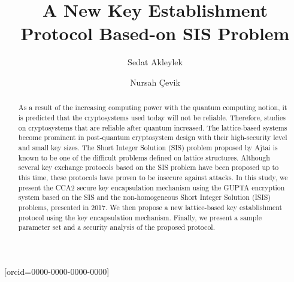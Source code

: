 \documentclass[a4paper,fleqn]{cas-dc}
\begin{document}
\let\WriteBookmarks\relax
\def\floatpagepagefraction{1}
\def\textpagefraction{.001}

\title [mode = title]{A New Key Establishment Protocol Based-on SIS Problem}          
\tnotemark[1,2]



\author[1]{Sedat Akleylek}[orcid=0000-0000-0000-0000]     
\cormark[1]

\author[1]{Nursah \c{C}evik}
\fnmark[1]

\address[1]{Department of Computer Engineering, Faculty of Engineering, Ondokuz Mayis University, Samsun, Turkey}








\begin{abstract}
	As a result of the increasing computing power with the quantum computing notion, it is predicted that the cryptosystems used today will not be reliable. Therefore, studies on cryptosystems that are reliable after quantum increased. The lattice-based systems become prominent in post-quantum cryptosystem design with their high-security level and small key sizes. The Short Integer Solution (SIS) problem proposed by Ajtai is known to be one of the difficult problems defined on lattice structures. Although several key exchange protocols based on the SIS problem have been proposed up to this time, these protocols have proven to be insecure against attacks. In this study, we present the CCA2 secure key encapsulation mechanism using the GUPTA encryption system based on the SIS and the non-homogeneous Short Integer Solution (ISIS) problems, presented in 2017. We then propose a new lattice-based key establishment protocol using the key encapsulation mechanism. Finally, we present a sample parameter set and a security analysis of the proposed protocol.
	
\end{abstract}
\end{document}
